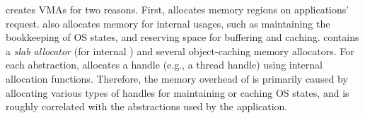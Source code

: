 \thelibos{} creates VMAs for two reasons.
First, \thelibos{} allocates memory regions on applications' request.
\thelibos{} also allocates memory for internal usages,
such as maintaining
the bookkeeping of OS states,
and reserving space for buffering and caching.
\thelibos{} contains a {\em slab allocator} (for internal ) and several object-caching memory allocators.
For each abstraction, \thelibos{} allocates a handle (e.g., a thread handle)
using internal allocation functions.
Therefore, the memory overhead of \thelibos{} %
is primarily caused by allocating various types of handles for maintaining or caching OS states,
and is roughly correlated with
the abstractions used by the application. 






